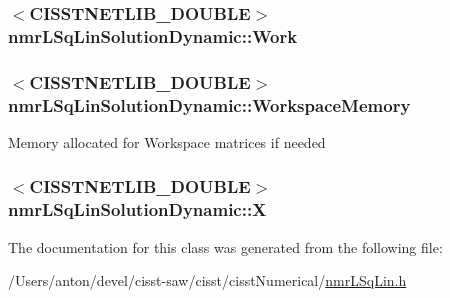 \subsubsection[{Work}]{$<$C\+I\+S\+S\+T\+N\+E\+T\+L\+I\+B\+\_\+\+D\+O\+U\+B\+L\+E$>$ nmr\+L\+Sq\+Lin\+Solution\+Dynamic\+::\+Work\hspace{0.3cm}{\ttfamily [protected]}}\label{classnmr_l_sq_lin_solution_dynamic_ae9c178092a5766140b996fa2f0287a06}
\hypertarget{classnmr_l_sq_lin_solution_dynamic_afa790c8ff0361dfe31522d1287cc03c2}{}
\subsubsection[{Workspace\+Memory}]{$<$C\+I\+S\+S\+T\+N\+E\+T\+L\+I\+B\+\_\+\+D\+O\+U\+B\+L\+E$>$ nmr\+L\+Sq\+Lin\+Solution\+Dynamic\+::\+Workspace\+Memory\hspace{0.3cm}{\ttfamily [protected]}}\label{classnmr_l_sq_lin_solution_dynamic_afa790c8ff0361dfe31522d1287cc03c2}
Memory allocated for Workspace matrices if needed \hypertarget{classnmr_l_sq_lin_solution_dynamic_a170954053506de199dd1636a50107538}{}
\subsubsection[{X}]{$<$C\+I\+S\+S\+T\+N\+E\+T\+L\+I\+B\+\_\+\+D\+O\+U\+B\+L\+E$>$ nmr\+L\+Sq\+Lin\+Solution\+Dynamic\+::\+X\hspace{0.3cm}{\ttfamily [protected]}}\label{classnmr_l_sq_lin_solution_dynamic_a170954053506de199dd1636a50107538}


The documentation for this class was generated from the following file\+:\begin{DoxyCompactItemize}
\item 
/\+Users/anton/devel/cisst-\/saw/cisst/cisst\+Numerical/\hyperlink{nmr_l_sq_lin_8h}{nmr\+L\+Sq\+Lin.\+h}\end{DoxyCompactItemize}

